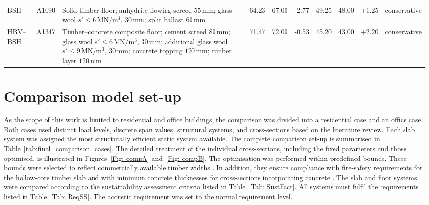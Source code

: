 \begin{table}[h]
\begin{tabularx}{\textwidth}{@{}l|c|>{\raggedright\arraybackslash}X|r|r|r|r|r|r|l@{}}
    BSH &
    A1090 &
    Solid timber floor; anhydrite flowing screed $55\,\mathrm{mm}$; glass wool $s'\leq6\,\mathrm{MN/m^3}$, $30\,\mathrm{mm}$; split ballast $60\,\mathrm{mm}$ &
    64.23 & 67.00 & -2.77 & 49.25 & 48.00 & +1.25 & conservative \\

    HBV--BSH &
    A1347 &
    Timber--concrete composite floor; cement screed $80\,\mathrm{mm}$; glass wool $s'\leq6\,\mathrm{MN/m^3}$, $30\,\mathrm{mm}$; additional glass wool $s'\leq9\,\mathrm{MN/m^3}$, $30\,\mathrm{mm}$; concrete topping $120\,\mathrm{mm}$; timber layer $120\,\mathrm{mm}$ &
    71.47 & 72.00 & -0.53 & 45.20 & 43.00 & +2.20 & conservative \\

    \hline
    \end{tabularx}
    \endgroup
\end{table}

\newpage
\section{Comparison model set-up}

As the scope of this work is limited to residential and office buildings, the comparison was divided into a residential case and an office case. Both cases used distinct load levels, discrete span values, structural systems, and cross-sections based on the literature review. Each slab system was assigned the most structurally efficient static system available. The complete comparison set-up is summarised in Table~\ref{tab:final_comparison_cases}. The detailed treatment of the individual cross-sections, including the fixed parameters and those optimised, is illustrated in Figures~\ref{Fig: compA} and~\ref{Fig: compB}. The optimisation was performed within predefined bounds. These bounds were selected to reflect commercially available timber widths \cite{BestWoodSchneider_Holz_2026}. In addition, they ensure compliance with fire-safety requirements for the hollow-core timber slab \cite{Lignum3.1:2015} and with minimum concrete thicknesses for cross-sections incorporating concrete \cite{SIA262_2025}. The slab and floor systems were compared according to the sustainability assessment criteria listed in Table~\ref{Tab: SustFact}. All systems must fulfil the requirements listed in Table~\ref{Tab: ReqSS}. The acoustic requirement was set to the normal requirement level.


